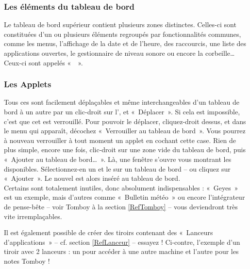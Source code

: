 \subsubsection{Les éléments du tableau de bord}
Le tableau de bord supérieur contient plusieurs zones distinctes. Celles-ci sont constituées d'un ou plusieurs éléments regroupés par fonctionnalités communes, comme les menus, l'affichage de la date et de l'heure, des raccourcis, une liste des applications ouvertes, le gestionnaire de niveau sonore ou encore la corbeille\ldots{} Ceux-ci sont appelés «~~».
\subsubsection{Les Applets}
\label{RefApplet}
Tous ces  sont facilement déplaçables et même interchangeables d'un tableau de bord à un autre par un clic-droit sur l', et «~Déplacer~». Si cela est impossible, c'est que cet  est verrouillé. Pour pouvoir le déplacer, cliquez-droit dessus, et dans le menu qui apparaît, décochez «~Verrouiller au tableau de bord~». Vous pourrez à nouveau verrouiller à tout moment un applet en cochant cette case.
Rien de plus simple, encore une fois, clic-droit sur une zone vide du tableau de bord, puis «~Ajouter au tableau de bord\ldots{}~». Là, une fenêtre s'ouvre vous montrant les  disponibles. Sélectionnez-en un et  le sur un tableau de bord -- ou cliquez sur «~Ajouter~». Le nouvel  est alors inséré au tableau de bord.\\
Certains sont totalement inutiles, donc absolument indispensables : «~Geyes~» est un exemple, mais d'autres comme «~Bulletin météo~» ou encore l'intégrateur de pense-bête -- voir Tomboy à la section \ref{RefTomboy} -- vous deviendront très vite irremplaçables.\par
{}
Il est également possible de créer des tiroirs contenant des «~Lanceurs d'applications~» -- cf. section \ref{RefLanceur} --  essayez ! Ci-contre, l'exemple d'un tiroir avec 2 lanceurs : un pour accéder à une autre machine et l'autre pour les notes Tomboy !\\\\\\

